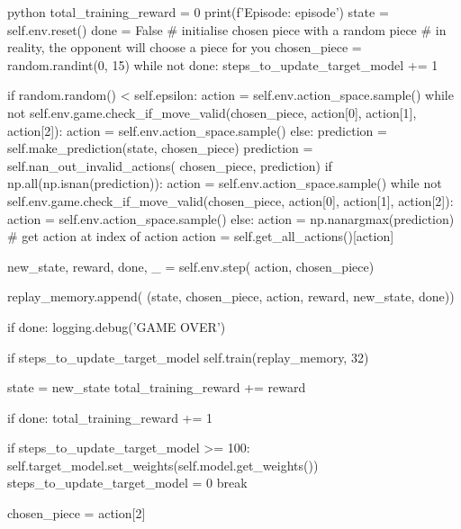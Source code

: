 \begin{mintedbox}{python}
            total_training_reward = 0
            print(f'Episode: {episode}')
            state = self.env.reset()
            done = False
            # initialise chosen piece with a random piece
            # in reality, the opponent will choose a piece for you
            chosen_piece = random.randint(0, 15)
            while not done:
                steps_to_update_target_model += 1

                if random.random() < self.epsilon:
                    action = self.env.action_space.sample()
                    while not self.env.game.check_if_move_valid(chosen_piece, action[0], action[1], action[2]):
                        action = self.env.action_space.sample()
                else:
                    prediction = self.make_prediction(state, chosen_piece)
                    prediction = self.nan_out_invalid_actions(
                        chosen_piece, prediction)
                    if np.all(np.isnan(prediction)):
                        action = self.env.action_space.sample()
                        while not self.env.game.check_if_move_valid(chosen_piece, action[0], action[1], action[2]):
                            action = self.env.action_space.sample()
                    else:
                        action = np.nanargmax(prediction)
                        # get action at index of action
                        action = self.get_all_actions()[action]

                new_state, reward, done, _ = self.env.step(
                    action, chosen_piece)

                replay_memory.append(
                    (state, chosen_piece, action, reward, new_state, done))

                if done:
                    logging.debug('GAME OVER')

                if steps_to_update_target_model %
                    self.train(replay_memory, 32)

                state = new_state
                total_training_reward += reward

                if done:
                    total_training_reward += 1

                    if steps_to_update_target_model >= 100:
                        self.target_model.set_weights(self.model.get_weights())
                        steps_to_update_target_model = 0
                    break

                chosen_piece = action[2]


\end{mintedbox}
